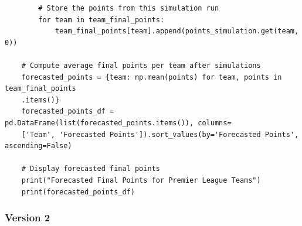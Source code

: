 \documentclass{article}
\begin{document}
\begin{verbatim}
        # Store the points from this simulation run
        for team in team_final_points:
            team_final_points[team].append(points_simulation.get(team, 0))
    
    # Compute average final points per team after simulations
    forecasted_points = {team: np.mean(points) for team, points in team_final_points
    .items()}
    forecasted_points_df = pd.DataFrame(list(forecasted_points.items()), columns=
    ['Team', 'Forecasted Points']).sort_values(by='Forecasted Points', ascending=False)
    
    # Display forecasted final points
    print("Forecasted Final Points for Premier League Teams")
    print(forecasted_points_df)
\end{verbatim}

\subsubsection*{Version 2}
\end{document}
